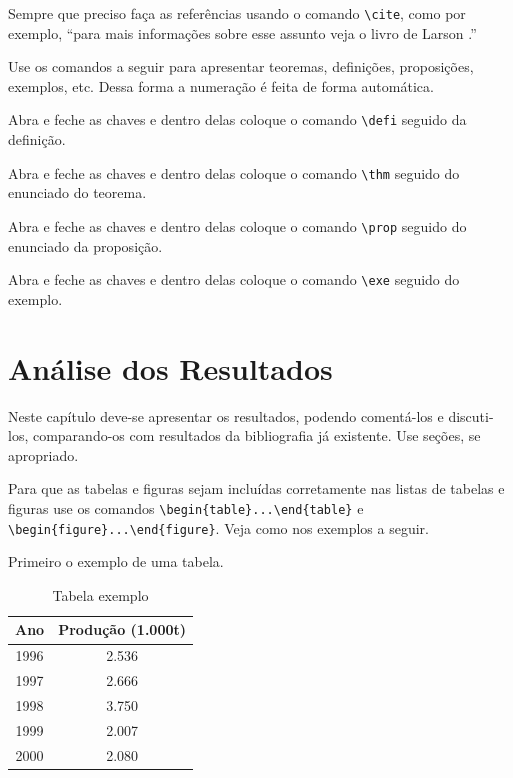 \documentclass[12pt,a4paper,header]{abnt}
\begin{document}
Sempre que preciso faça as referências usando o comando \verb|\cite|, como por exemplo, ``para mais informações sobre esse assunto veja o livro de Larson \cite{larson}.''

Use os comandos a seguir para apresentar teoremas, definições, proposições, exemplos, etc. Dessa forma a numeração é feita de forma automática. 

{
Abra e feche as chaves e dentro delas coloque o comando \verb|\defi| seguido da definição. 
}

{\thm
Abra e feche as chaves e dentro delas coloque o comando \verb|\thm| seguido do enunciado do teorema. 
}

{\prop
Abra e feche as chaves e dentro delas coloque o comando \verb|\prop| seguido do enunciado da proposição.
}


{\exe
Abra e feche as chaves e dentro delas coloque o comando \verb|\exe| seguido do exemplo.
}




\chapter{Análise dos Resultados}


Neste capítulo deve-se apresentar os resultados, podendo comentá-los e discuti-los, comparando-os com resultados da bibliografia já existente. Use seções, se apropriado.

Para que as tabelas e figuras sejam incluídas corretamente nas listas de tabelas e figuras use os comandos 
\verb|\begin{table}...\end{table}| e \verb|\begin{figure}...\end{figure}|. Veja como nos exemplos a seguir.

Primeiro o exemplo de uma tabela. 

\begin{table}[h!]
\centering
\caption{Tabela exemplo} \label{fig:exemplo}
\begin{tabular}{cc}
\hline
Ano & Produção (1.000t)\\
\hline
1996 & 2.536\\
1997 & 2.666\\
1998 & 3.750\\
1999 & 2.007\\
2000 & 2.080\\
\hline
\end{tabular}
\end{table}
\end{document}
